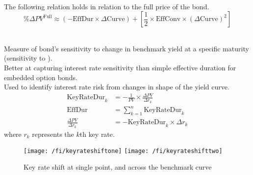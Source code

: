 \begin{remark} \\
The following relation holds in relation to the full price of the bond.
\begin{equation}
\% \Delta PV^{\text{Full}} \approx (-\text{EffDur} \times \Delta \text{Curve}) + \left[ \frac{1}{2} \times \text{EffConv} \times (\Delta \text{Curve})^2 \right] \nonumber
\end{equation}
\end{remark}

\begin{definition} \\
Measure of bond’s sensitivity to change in benchmark yield at a specific maturity (sensitivity to ).\\
Better at capturing interest rate sensitivity than simple effective duration for embedded option bonds.\\
Used to identify interest rate risk from changes in shape of the yield curve.
\begin{align}
\text{KeyRateDur}_k &= - \frac{1}{PV} \times \frac{\Delta PV}{\Delta r_k} \nonumber \\
\text{EffDur} &= \sum\limits_{k=1}^n \text{KeyRateDur}_k \nonumber \\
\frac{\Delta PV}{\Delta r_k} &= -\text{KeyRateDur}_k \times \Delta r_k \nonumber
\end{align}
where $r_k$ represents the $k$th key rate.
\end{definition}

\begin{figure}[H]
\centering
\texttt{[image: /fi/keyrateshiftone]}
\texttt{[image: /fi/keyrateshifttwo]}
\caption{Key rate shift at single point, and across the benchmark curve}
\end{figure}

